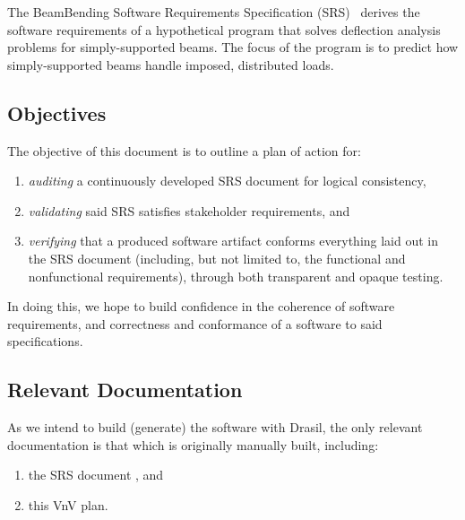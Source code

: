 \documentclass[12pt, titlepage]{article}
\begin{document}
The BeamBending Software Requirements Specification
(SRS)~\cite{BalaciBeamBendingSRS2023} derives the software requirements of a
hypothetical program that solves deflection analysis problems for
simply-supported beams. The focus of the program is to predict how
simply-supported beams handle imposed, distributed loads.

\subsection{Objectives}

The objective of this document is to outline a plan of action for:

\begin{enumerate}

    \item \textit{auditing} a continuously developed SRS document
          \cite{ParnasAndClements1986} for logical consistency,

    \item \textit{validating} said SRS satisfies stakeholder requirements, and

    \item \textit{verifying} that a produced software artifact conforms
          everything laid out in the SRS document (including, but not limited
          to, the functional and nonfunctional requirements), through both
          transparent and opaque testing.

\end{enumerate}

In doing this, we hope to build confidence in the coherence of software
requirements, and correctness and conformance of a software to said
specifications.

\subsection{Relevant Documentation}

As we intend to build (generate) the software with Drasil, the only relevant
documentation is that which is originally manually built, including:

\begin{enumerate}

    \item the SRS document \cite{BalaciBeamBendingSRS2023}, and

    \item this VnV plan.

\end{enumerate}
\end{document}

